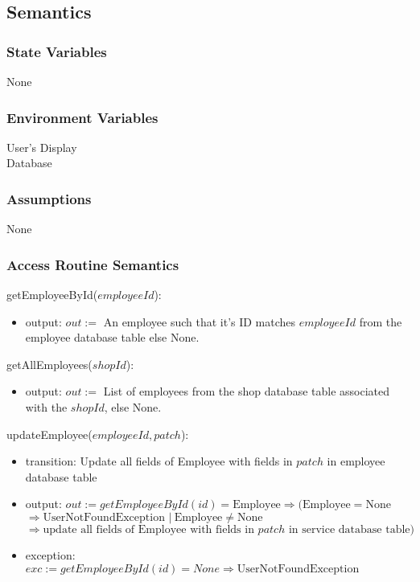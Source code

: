 \documentclass[12pt, titlepage]{article}
\begin{document}
\subsection{Semantics}

\subsubsection{State Variables}

None

\subsubsection{Environment Variables}

User's Display \\ Database

\subsubsection{Assumptions}

None

\subsubsection{Access Routine Semantics}

\noindent getEmployeeById($employeeId$):
\begin{itemize}
	\item output: $out :=$ An employee such that it's ID matches $employeeId$ from the employee database
	      table else None.
\end{itemize}

\noindent getAllEmployees($shopId$):
\begin{itemize}
	\item output: $out :=$ List of employees from the shop database table associated with the $shopId$, else
	      None.
\end{itemize}

\noindent updateEmployee($employeeId, patch$):
\begin{itemize}
	\item transition: Update all fields of Employee with fields in $patch$ in employee database table
	\item output: $out := getEmployeeById(id) = \text{Employee} \Rightarrow (\text{Employee} = \text{None} $
		      \\ $\Rightarrow \text{UserNotFoundException } |\ \text{Employee} \neq \text{None}$ \\ $\Rightarrow
		      \text{update all fields of Employee with fields in } patch \text{ in service database table})$
	\item exception: $exc := getEmployeeById(id) = None \Rightarrow \text{UserNotFoundException}$
\end{itemize}
\end{document}
